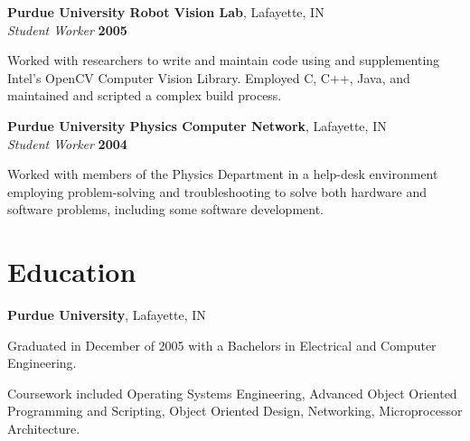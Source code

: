 \documentclass[margin,line]{resume}
\begin{document}
\begin{resume}
    {\bf Purdue University Robot Vision Lab}, Lafayette, IN  \vspace{2mm}\\\vspace{1mm}%
    {\sl Student Worker} \hfill {\bf 2005}\\
    \begin{list2}
        \vspace*{1mm}
        \item
            Worked with researchers to write and maintain code using and
            supplementing Intel's OpenCV Computer Vision Library.  Employed C,
            C++, Java, and maintained and scripted a complex build process.
    \end{list2} 

    {\bf Purdue University Physics Computer Network}, Lafayette, IN  \vspace{2mm}\\\vspace{1mm}%
    {\sl Student Worker} \hfill {\bf 2004}\\
    \begin{list2}
        \vspace*{1mm}
        \item
            Worked with members of the Physics Department in a help-desk
            environment employing problem-solving and troubleshooting to solve
            both hardware and software problems, including some software
            development.
    \end{list2} 

    \section{\mysidestyle Education}

    {\bf Purdue University}, Lafayette, IN \vspace{2mm}
    \begin{list2}
        \vspace*{1mm}
        \item
            Graduated in December of 2005 with a Bachelors in Electrical and
            Computer Engineering.
        \item
            Coursework included Operating Systems Engineering, Advanced Object Oriented
            Programming and Scripting, Object Oriented Design, Networking, Microprocessor
            Architecture.
    \end{list2}


\end{resume}
\end{document}
